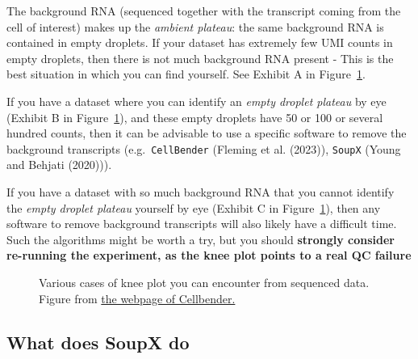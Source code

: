 \documentclass[
  letterpaper,
  DIV=11,
  numbers=noendperiod]{scrartcl}
\begin{document}
The background RNA (sequenced together with the transcript coming from
the cell of interest) makes up the \emph{ambient plateau}: the same
background RNA is contained in empty droplets. If your dataset has
extremely few UMI counts in empty droplets, then there is not much
background RNA present - This is the best situation in which you can
find yourself. See Exhibit A in Figure~\ref{fig-bender}.

If you have a dataset where you can identify an \emph{empty droplet
plateau} by eye (Exhibit B in Figure~\ref{fig-bender}), and these empty
droplets have 50 or 100 or several hundred counts, then it can be
advisable to use a specific software to remove the background
transcripts (e.g.~\texttt{CellBender} (Fleming et al. (2023)),
\texttt{SoupX} (Young and Behjati (2020))).

If you have a dataset with so much background RNA that you cannot
identify the \emph{empty droplet plateau} yourself by eye (Exhibit C in
Figure~\ref{fig-bender}), then any software to remove background
transcripts will also likely have a difficult time. Such the algorithms
might be worth a try, but you should \textbf{strongly consider
re-running the experiment, as the knee plot points to a real QC failure}

\begin{figure}


\caption{\label{fig-bender}Various cases of knee plot you can encounter
from sequenced data. Figure from
\href{https://cellbender.readthedocs.io/}{the webpage of Cellbender.}}

\end{figure}%

\subsection{What does SoupX do}\label{what-does-soupx-do}
\end{document}
